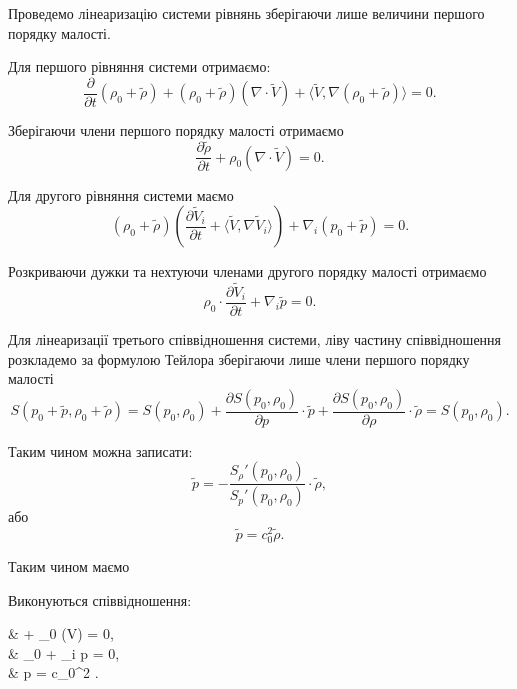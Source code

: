 Проведемо лінеаризацію системи рівнянь зберігаючи лише величини першого порядку малості. \medskip

Для першого рівняння системи отримаємо:
\begin{equation}
	\frac{\partial}{\partial t} (\rho_0 + \tilde \rho) + (\rho_0 + \tilde \rho) (\nabla \cdot \tilde V) + \langle \tilde V, \nabla (\rho_0 + \tilde \rho) \rangle = 0.
\end{equation}

Зберігаючи члени першого порядку малості отримаємо
\begin{equation}
	\frac{\partial \tilde \rho}{\partial t} + \rho_0 (\nabla \cdot \tilde V) = 0.
\end{equation}

Для другого рівняння системи маємо
\begin{equation}
	(\rho_0 + \tilde \rho) \left( \frac{\partial \tilde V_i}{\partial t} + \langle \tilde V, \nabla \tilde V_i \rangle \right) + \nabla_i (p_0 + \tilde p) = 0.
\end{equation}

Розкриваючи дужки та нехтуючи членами другого порядку малості отримаємо
\begin{equation}
	\rho_0 \cdot \frac{\partial \tilde V_i}{\partial t} + \nabla_i \tilde p = 0.
\end{equation}

Для лінеаризації третього співвідношення системи, ліву частину співвідношення розкладемо за формулою Тейлора зберігаючи лише члени першого порядку малості
\begin{equation}
	S(p_0 + \tilde p, \rho_0 + \tilde \rho) = S(p_0, \rho_0) + \frac{\partial S(p_0, \rho_0)}{\partial p} \cdot \tilde p + \frac{\partial S(p_0, \rho_0)}{\partial \rho} \cdot \tilde \rho = S(p_0, \rho_0).
\end{equation}

Таким чином можна записати:
\begin{equation}
	\tilde p = - \frac{S_\rho' (p_0, \rho_0)}{S_p'(p_0, \rho_0)} \cdot \tilde \rho,
\end{equation}
або
\begin{equation}
	\tilde p = c_0^2 \tilde \rho.
\end{equation}

Таким чином маємо
\begin{th_equation}
	Виконуються співвідношення:
	\begin{system}
		&  + \rho_0 (\nabla \cdot \tilde V) = 0, \\
		& \rho_0 \cdot {} + \nabla_i \tilde p = 0, \\
		& \tilde p = c_0^2 \tilde \rho.
	\end{system}
\end{th_equation}

